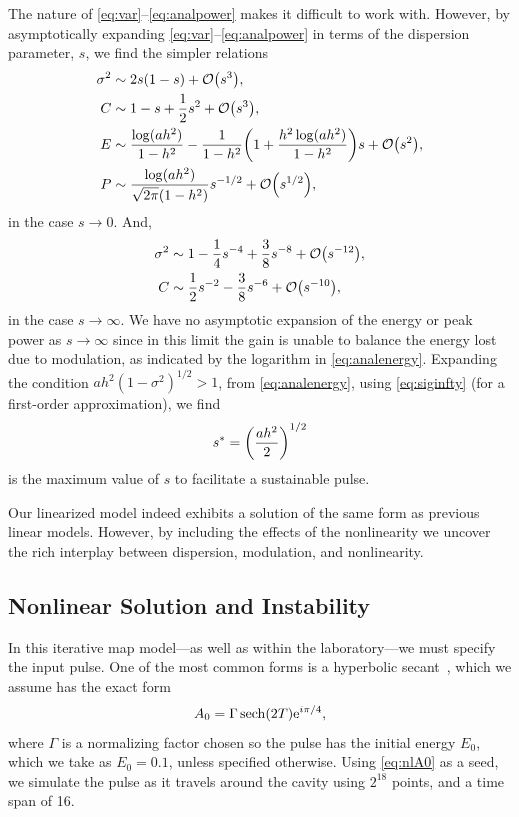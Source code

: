 \documentclass[9pt,twocolumn,twoside]{osajnl}
\let\originalleft\left
\let\originalright\right
\renewcommand{\left}{\mathopen{}\mathclose\bgroup\originalleft}
\renewcommand{\right}{\aftergroup\egroup\originalright}
\providecommand{\bigO}[1]{\ensuremath{\mathop{}\mathopen{}\mathcal{O}\mathopen{}\left(#1\right)}} %
\DeclareMathOperator{\sech}{sech}
\begin{document}
The nature of \eqref{eq:var}--\eqref{eq:analpower} makes it difficult to work with. However, by asymptotically expanding \eqref{eq:var}--\eqref{eq:analpower} in terms of the dispersion parameter, $s$, we find the simpler relations
\begin{align}
	\sigma^2 &\sim 2s(1 - s) + \bigO{s^3}, \\
	C &\sim 1 - s + \frac{1}{2}s^2 + \bigO{s^3}, \\
	E &\sim \frac{\log (a h^2)}{1 - h^2} - \frac{1}{1 - h^2} \left( 1 + \frac{h^2 \log(a h^2)}{1 - h^2}  \right) s + \bigO{s^2}, \label{eq:maxenergy} \\
	P &\sim \frac{\log(ah^2)}{\sqrt{2 \pi}(1 - h^2)} s^{-1/2} + \bigO{s^{1/2}},
\end{align}
in the case $s \rightarrow 0$. And,
\begin{align}
	\sigma^2 &\sim 1 - \frac{1}{4}s^{-4} + \frac{3}{8}s^{-8} + \bigO{s^{-12}}, \label{eq:siginfty}\\
	C &\sim \frac{1}{2}s^{-2} - \frac{3}{8}s^{-6} + \bigO{s^{-10}},
\end{align}
in the case $s \rightarrow \infty$. We have no asymptotic expansion of the energy or peak power as $s \rightarrow \infty$ since in this limit the gain is unable to balance the energy lost due to modulation, as indicated by the logarithm in \eqref{eq:analenergy}. Expanding the condition $a h^2 (1 - \sigma^2)^{1/2} > 1$, from \eqref{eq:analenergy}, using \eqref{eq:siginfty} (for a first-order approximation), we find 
\begin{align}
	s^* = \left( \frac{a h^2}{2} \right)^{1/2}
\end{align}
is the maximum value of $s$ to facilitate a sustainable pulse.

Our linearized model indeed exhibits a solution of the same form as previous linear models. However, by including the effects of the nonlinearity we uncover the rich interplay between dispersion, modulation, and nonlinearity.

\subsection{Nonlinear Solution and Instability}
\label{sec:nlresults}
In this iterative map model---as well as within the laboratory---we must specify the input pulse. One of the most common forms is a hyperbolic secant~\cite{coen1997, finot2008, rothenberg1989b, tomlinson1984}, which we assume has the exact form
\begin{align}
	A_0 = \Gamma \sech \left( 2 T \right) \textrm{e}^{i \pi / 4},
	\label{eq:nlA0}
\end{align}
where $\Gamma$ is a normalizing factor chosen so the pulse has the initial energy $E_0$, which we take as $E_0 = 0.1$, unless specified otherwise. Using \eqref{eq:nlA0} as a seed, we simulate the pulse as it travels around the cavity using $2^{18}$ points, and a time span of 16.
\end{document}
